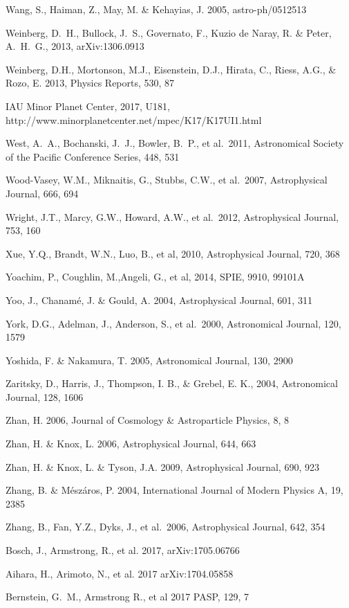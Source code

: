 \documentclass[twocolumn]{aastex61}
\begin{document}
\begin{thebibliography}{}
\bibitem[()]{} Wang, S., Haiman, Z., May, M. \& Kehayias, J. 2005, astro-ph/0512513

\bibitem[()]{} Weinberg, D.~H., Bullock, J.~S., Governato, F., Kuzio de Naray, R. \& Peter, A.~H.~G., 2013, arXiv:1306.0913

\bibitem[()]{} Weinberg, D.H., Mortonson, M.J., Eisenstein, D.J.,
  Hirata, C., Riess, A.G., \& Rozo, E. 2013, Physics Reports, 530, 87

IAU Minor Planet Center, 2017, U181, http://www.minorplanetcenter.net/mpec/K17/K17UI1.html

\bibitem[()]{} West, A.~A., Bochanski, J.~J., Bowler, B.~P., et al.~2011, Astronomical Society of the Pacific
                  Conference Series, 448, 531

\bibitem[()]{} Wood-Vasey, W.M., Miknaitis, G., Stubbs, C.W., et al.~2007, Astrophysical Journal, 666, 694

\bibitem[()]{} Wright, J.T., Marcy, G.W., Howard, A.W., et al.~2012, Astrophysical Journal, 753, 160

\bibitem[()]{} Xue, Y.Q., Brandt, W.N., Luo, B., et al, 2010,  Astrophysical Journal, 720, 368

\bibitem[()]{} Yoachim, P., Coughlin, M.,Angeli, G., et al, 2014, SPIE, 9910, 99101A

\bibitem[()]{} Yoo, J., Chanam\'{e}, J. \& Gould, A. 2004, Astrophysical Journal, 601, 311

 York, D.G., Adelman, J., Anderson, S., et al.~2000, Astronomical Journal, 120, 1579

\bibitem[()]{} Yoshida, F. \& Nakamura, T. 2005, Astronomical Journal, 130, 2900

\bibitem[()]{} Zaritsky, D., Harris, J., Thompson, I. B., \& Grebel, E. K., 2004, Astronomical Journal, 128, 1606

\bibitem[()]{} Zhan, H. 2006, Journal of Cosmology \& Astroparticle Physics, 8, 8

\bibitem[()]{} Zhan, H. \& Knox, L. 2006,  Astrophysical Journal, 644, 663

\bibitem[()]{} Zhan, H. \& Knox, L. \& Tyson, J.A. 2009,  Astrophysical Journal, 690, 923

\bibitem[()]{} Zhang, B. \& M\'{e}sz\'{a}ros, P. 2004, International Journal of Modern Physics A, 19, 2385

\bibitem[()]{} Zhang, B., Fan, Y.Z., Dyks, J., et al.~2006,  Astrophysical Journal, 642, 354

 Bosch, J., Armstrong, R., et al. 2017, arXiv:1705.06766

 Aihara, H., Arimoto, N., et al. 2017 arXiv:1704.05858

 Bernstein, G.~M., Armstrong R., et al 2017 PASP, 129, 7

\end{thebibliography}
\end{document}

